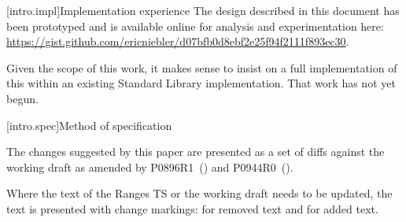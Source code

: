 [intro.impl]{Implementation experience}
\pnum
The design described in this document has been prototyped and is available
online for analysis and experimentation here:
\url{https://gist.github.com/ericniebler/d07bfb0d8ebf2e25f94f2111f893ec30}.

\pnum
Given the scope of this work, it makes sense to insist on a full implementation
of this within an existing Standard Library implementation. That work has not
yet begun.

[intro.spec]{Method of specification}

\pnum
The changes suggested by this paper are presented as a set of diffs against
the working draft as amended by P0896R1~(\cite{P0896}) and P0944R0~(\cite{P0944}).

\pnum
Where the text of the Ranges TS or the working draft needs to be updated,
the text is presented with change markings:  for
removed text and  for added text.
